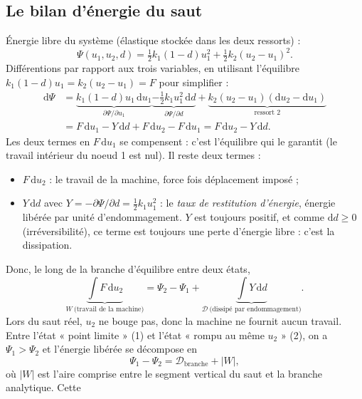 \documentclass[11pt,a4paper]{article}
\newcommand{\dd}{\mathrm{d}}
\begin{document}
\subsection{Le bilan d'énergie du saut}
\label{sec:energie}
Énergie libre du système (élastique stockée dans les deux ressorts) :
\begin{equation}
  \Psi(u_1,u_2,d) = \tfrac12k_1(1-d)u_1^2 + \tfrac12k_2(u_2-u_1)^2 .
\end{equation}
Différentions par rapport aux trois variables, en utilisant l'équilibre
$k_1(1-d)u_1 = k_2(u_2-u_1) = F$ pour simplifier :
\begin{align}
  \dd\Psi &= \underbrace{k_1(1-d)u_1\,\dd u_1}_{\partial\Psi/\partial u_1}
           \underbrace{-\tfrac12k_1u_1^2\,\dd d}_{\partial\Psi/\partial d}
           + \underbrace{k_2(u_2-u_1)(\dd u_2-\dd u_1)}_{\text{ressort 2}}\\
          &= F\,\dd u_1 - Y\,\dd d + F\,\dd u_2 - F\,\dd u_1 = F\,\dd u_2 - Y\,\dd d .
\end{align}
Les deux termes en $F\,\dd u_1$ se compensent : c'est l'équilibre qui le garantit (le travail
intérieur du noeud 1 est nul). Il reste deux termes :
\begin{itemize}[nosep]
  \item $F\,\dd u_2$ : le travail de la machine, force fois déplacement imposé ;
  \item $Y\,\dd d$ avec $Y = -\partial\Psi/\partial d = \tfrac12k_1u_1^2$ : le \emph{taux de
        restitution d'énergie}, énergie libérée par unité d'endommagement. $Y$ est toujours
        positif, et comme $\dd d \ge 0$ (irréversibilité), ce terme est toujours une perte
        d'énergie libre : c'est la dissipation.
\end{itemize}
Donc, le long de la branche d'équilibre entre deux états,
\begin{equation}
  \underbrace{\int F\,\dd u_2}_{W\ \text{(travail de la machine)}} = \Psi_2-\Psi_1 + \underbrace{\int Y\,\dd d}_{\mathcal D\ \text{(dissipé par endommagement)}} .
\end{equation}
Lors du saut réel, $u_2$ ne bouge pas, donc la machine ne fournit aucun travail. Entre l'état
« point limite » (1) et l'état « rompu au même $u_2$ » (2), on a $\Psi_1 > \Psi_2$ et l'énergie
libérée se décompose en
\begin{equation}
  \Psi_1-\Psi_2 = \mathcal D_{\text{branche}} + |W| ,
\end{equation}
où $|W|$ est l'aire comprise entre le segment vertical du saut et la branche analytique. Cette
\end{document}
